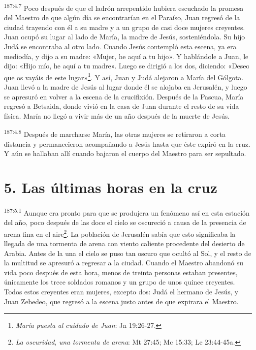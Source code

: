 \par
\textsuperscript{187:4.7} Poco después de que el ladrón arrepentido hubiera escuchado la promesa del Maestro de que algún día se encontrarían en el Paraíso, Juan regresó de la ciudad trayendo con él a su madre y a un grupo de casi doce mujeres creyentes. Juan ocupó su lugar al lado de María, la madre de Jesús, sosteniéndola. Su hijo Judá se encontraba al otro lado. Cuando Jesús contempló esta escena, ya era mediodía, y dijo a su madre: «Mujer, he aquí a tu hijo». Y hablándole a Juan, le dijo: «Hijo mío, he aquí a tu madre». Luego se dirigió a los dos, diciendo: «Deseo que os vayáis de este lugar»\footnote{\textit{María puesta al cuidado de Juan}: Jn 19:26-27.}. Y así, Juan y Judá alejaron a María del Gólgota. Juan llevó a la madre de Jesús al lugar donde él se alojaba en Jerusalén, y luego se apresuró en volver a la escena de la crucifixión. Después de la Pascua, María regresó a Betsaida, donde vivió en la casa de Juan durante el resto de su vida física. María no llegó a vivir más de un año después de la muerte de Jesús.

\par
\textsuperscript{187:4.8} Después de marcharse María, las otras mujeres se retiraron a corta distancia y permanecieron acompañando a Jesús hasta que éste expiró en la cruz. Y aún se hallaban allí cuando bajaron el cuerpo del Maestro para ser sepultado.

\section*{5. Las últimas horas en la cruz}
\par
\textsuperscript{187:5.1} Aunque era pronto para que se produjera un fenómeno así en esta estación del año, poco después de las doce el cielo se oscureció a causa de la presencia de arena fina en el aire\footnote{\textit{La oscuridad, una tormenta de arena}: Mt 27:45; Mc 15:33; Lc 23:44-45a.}. La población de Jerusalén sabía que esto significaba la llegada de una tormenta de arena con viento caliente procedente del desierto de Arabia. Antes de la una el cielo se puso tan oscuro que ocultó al Sol, y el resto de la multitud se apresuró a regresar a la ciudad. Cuando el Maestro abandonó su vida poco después de esta hora, menos de treinta personas estaban presentes, únicamente los trece soldados romanos y un grupo de unos quince creyentes. Todos estos creyentes eran mujeres, excepto dos: Judá el hermano de Jesús, y Juan Zebedeo, que regresó a la escena justo antes de que expirara el Maestro.

